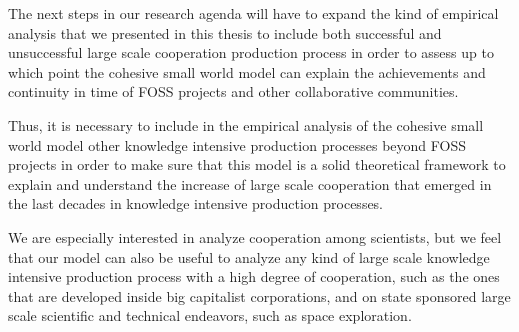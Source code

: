 The next steps in our research agenda will have to expand the kind of empirical analysis that we presented in this thesis to include both successful and unsuccessful large scale cooperation production process in order to assess up to which point the cohesive small world model can explain the achievements and continuity in time of FOSS projects and other collaborative communities.

Thus, it is necessary to include in the empirical analysis of the cohesive small world model other knowledge intensive production processes beyond FOSS projects in order to make sure that this model is a solid theoretical framework to explain and understand the increase of large scale cooperation that emerged in the last decades in knowledge intensive production processes.

We are especially interested in analyze cooperation among scientists, but we feel that our model can also be useful to analyze any kind of large scale knowledge intensive production process with a high degree of cooperation, such as the ones that are developed inside big capitalist corporations, and on state sponsored large scale scientific and technical endeavors, such as space exploration.
